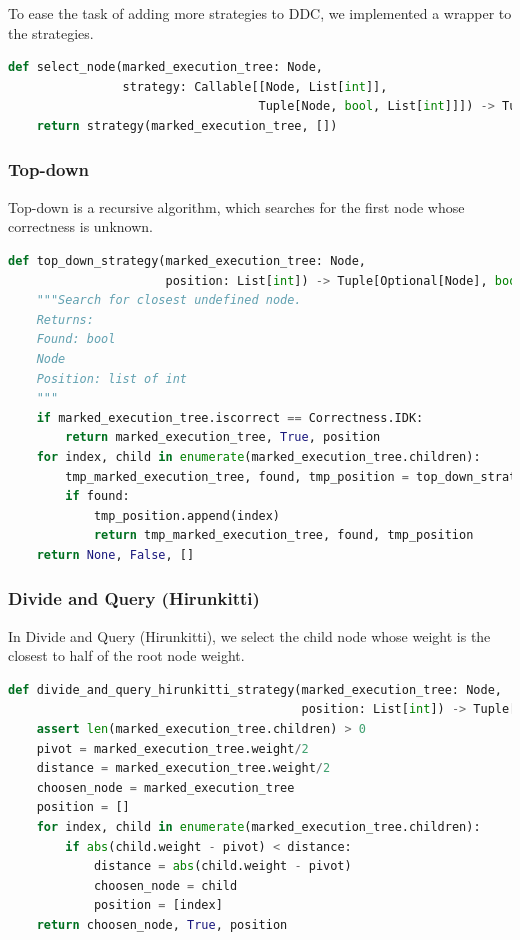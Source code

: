 To ease the task of adding more strategies to DDC, we implemented a wrapper to the strategies.
\begin{lstlisting}[language=Python, caption=Select node implementation]
def select_node(marked_execution_tree: Node,
                strategy: Callable[[Node, List[int]],
                                   Tuple[Node, bool, List[int]]]) -> Tuple[Node, bool, List[int]]:
    return strategy(marked_execution_tree, [])
\end{lstlisting}
\subsubsection{Top-down}
Top-down is a recursive algorithm, which searches for the first node whose correctness is unknown. 
\begin{lstlisting}[language=Python, caption=Top-down strategy implementation]
def top_down_strategy(marked_execution_tree: Node,
                      position: List[int]) -> Tuple[Optional[Node], bool, List[int]]:
    """Search for closest undefined node.
    Returns:
    Found: bool
    Node
    Position: list of int
    """
    if marked_execution_tree.iscorrect == Correctness.IDK:
        return marked_execution_tree, True, position
    for index, child in enumerate(marked_execution_tree.children):
        tmp_marked_execution_tree, found, tmp_position = top_down_strategy(child, position)
        if found:
            tmp_position.append(index)
            return tmp_marked_execution_tree, found, tmp_position
    return None, False, []
\end{lstlisting}
\subsubsection{Divide and Query (Hirunkitti)}
In Divide and Query (Hirunkitti), we select the child node whose weight is the closest to half of the root node weight.
\begin{lstlisting}[language=Python, caption=Divide and Query (Hirunkitti) strategy implementation]
def divide_and_query_hirunkitti_strategy(marked_execution_tree: Node,
                                         position: List[int]) -> Tuple[Node, bool, List[int]]:
    assert len(marked_execution_tree.children) > 0
    pivot = marked_execution_tree.weight/2
    distance = marked_execution_tree.weight/2
    choosen_node = marked_execution_tree
    position = []
    for index, child in enumerate(marked_execution_tree.children):
        if abs(child.weight - pivot) < distance:
            distance = abs(child.weight - pivot)
            choosen_node = child
            position = [index]
    return choosen_node, True, position
\end{lstlisting}
